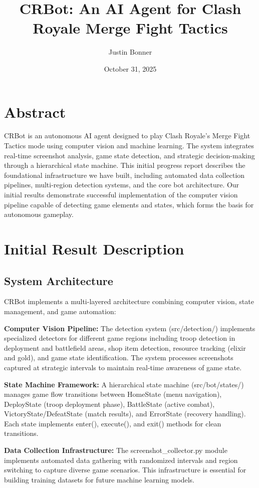 \documentclass[12pt]{article}
\title{\textbf{CRBot: An AI Agent for Clash Royale Merge Fight Tactics}}
\author{Justin Bonner}
\date{October 31, 2025}
\begin{document}
\maketitle

\section*{Abstract}
CRBot is an autonomous AI agent designed to play Clash Royale's Merge Fight Tactics mode using computer vision and machine learning. The system integrates real-time screenshot analysis, game state detection, and strategic decision-making through a hierarchical state machine. This initial progress report describes the foundational infrastructure we have built, including automated data collection pipelines, multi-region detection systems, and the core bot architecture. Our initial results demonstrate successful implementation of the computer vision pipeline capable of detecting game elements and states, which forms the basis for autonomous gameplay.

\section*{Initial Result Description}

\subsection*{System Architecture}
CRBot implements a multi-layered architecture combining computer vision, state management, and game automation:

\textbf{Computer Vision Pipeline:} The detection system (src/detection/) implements specialized detectors for different game regions including troop detection in deployment and battlefield areas, shop item detection, resource tracking (elixir and gold), and game state identification. The system processes screenshots captured at strategic intervals to maintain real-time awareness of game state.

\textbf{State Machine Framework:} A hierarchical state machine (src/bot/states/) manages game flow transitions between HomeState (menu navigation), DeployState (troop deployment phase), BattleState (active combat), VictoryState/DefeatState (match results), and ErrorState (recovery handling). Each state implements enter(), execute(), and exit() methods for clean transitions.

\textbf{Data Collection Infrastructure:} The screenshot\_collector.py module implements automated data gathering with randomized intervals and region switching to capture diverse game scenarios. This infrastructure is essential for building training datasets for future machine learning models.
\end{document}
